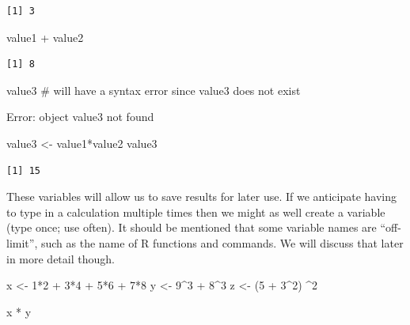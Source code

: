 \documentclass[
  letterpaper,
  DIV=11,
  numbers=noendperiod]{scrreprt}
\newenvironment{Shaded}{\begin{snugshade}}{\end{snugshade}}
\newcommand{\CommentTok}[1]{\textcolor[rgb]{0.37,0.37,0.37}{#1}}
\newcommand{\DecValTok}[1]{\textcolor[rgb]{0.68,0.00,0.00}{#1}}
\newcommand{\NormalTok}[1]{\textcolor[rgb]{0.00,0.23,0.31}{#1}}
\newcommand{\OtherTok}[1]{\textcolor[rgb]{0.00,0.23,0.31}{#1}}
\newcommand{\SpecialCharTok}[1]{\textcolor[rgb]{0.37,0.37,0.37}{#1}}
\begin{document}
\begin{verbatim}
[1] 3
\end{verbatim}

\begin{Shaded}
\begin{Highlighting}[]
\NormalTok{value1 }\SpecialCharTok{+}\NormalTok{ value2}
\end{Highlighting}
\end{Shaded}

\begin{verbatim}
[1] 8
\end{verbatim}

\begin{Shaded}
\begin{Highlighting}[]
\NormalTok{value3 }\CommentTok{\# will have a syntax error since value3 does not exist}
\end{Highlighting}
\end{Shaded}

{Error: object \textquotesingle value3\textquotesingle{} not found}

\begin{Shaded}
\begin{Highlighting}[]
\NormalTok{value3 }\OtherTok{\textless{}{-}}\NormalTok{ value1}\SpecialCharTok{*}\NormalTok{value2}
\NormalTok{value3}
\end{Highlighting}
\end{Shaded}

\begin{verbatim}
[1] 15
\end{verbatim}

These variables will allow us to save results for later use. If we
anticipate having to type in a calculation multiple times then we might
as well create a variable (type once; use often). It should be mentioned
that some variable names are ``off-limit'', such as the name of R
functions and commands. We will discuss that later in more detail
though.

\begin{Shaded}
\begin{Highlighting}[]
\NormalTok{x }\OtherTok{\textless{}{-}} \DecValTok{1}\SpecialCharTok{*}\DecValTok{2} \SpecialCharTok{+} \DecValTok{3}\SpecialCharTok{*}\DecValTok{4} \SpecialCharTok{+} \DecValTok{5}\SpecialCharTok{*}\DecValTok{6} \SpecialCharTok{+} \DecValTok{7}\SpecialCharTok{*}\DecValTok{8}
\NormalTok{y }\OtherTok{\textless{}{-}} \DecValTok{9}\SpecialCharTok{\^{}}\DecValTok{3} \SpecialCharTok{+} \DecValTok{8}\SpecialCharTok{\^{}}\DecValTok{3}
\NormalTok{z }\OtherTok{\textless{}{-}}\NormalTok{ (}\DecValTok{5} \SpecialCharTok{+} \DecValTok{3}\SpecialCharTok{\^{}}\DecValTok{2}\NormalTok{) }\SpecialCharTok{\^{}}\DecValTok{2}

\NormalTok{x }\SpecialCharTok{*}\NormalTok{ y}
\end{Highlighting}
\end{Shaded}
\end{document}
